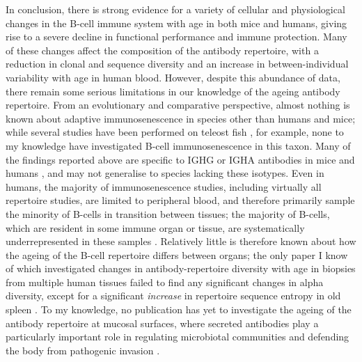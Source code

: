 In conclusion, there is strong evidence for a variety of cellular and physiological changes in the B-cell immune system with age in both mice and humans, giving rise to a severe decline in functional performance and immune protection. Many of these changes affect the composition of the antibody repertoire, with a reduction in clonal and sequence diversity and an increase in between-individual variability with age in human blood. However, despite this abundance of data, there remain some serious limitations in our knowledge of the ageing antibody repertoire.  From an evolutionary and comparative perspective, almost nothing is known about adaptive immunosenescence in species other than humans and mice; while several \igseq studies have been performed on teleost fish \parencite{weinstein2009igseq,jiang2011determinism,krasnov2017igseq,lund2019salmon,fu2018fugu}, for example, none to my knowledge have investigated B-cell immunosenescence in this taxon. Many of the findings reported above are specific to IGHG or IGHA antibodies in mice and humans \parencite{kogut2012bcells}, and may not generalise to species lacking these isotypes. Even in humans, the majority of immunosenescence studies, including virtually all repertoire studies, are limited to peripheral blood, and therefore primarily sample the minority of B-cells in transition between tissues; the majority of B-cells, which are resident in some immune organ or tissue, are systematically underrepresented in these samples \parencite{siegrist2009extremes,tabibiankeissar2016ageing}. Relatively little is therefore known about how the ageing of the B-cell repertoire differs between organs; the only paper I know of which investigated changes in antibody-repertoire diversity with age in biopsies from multiple human tissues failed to find any significant changes in alpha diversity, except for a significant \textit{increase} in repertoire sequence entropy in old spleen \parencite{tabibiankeissar2016ageing}. To my knowledge, no publication has yet to investigate the ageing of the antibody repertoire at mucosal surfaces, where secreted antibodies play a particularly important role in regulating microbiotal communities and defending the body from pathogenic invasion \parencite{belkaid2014microbiota}.

